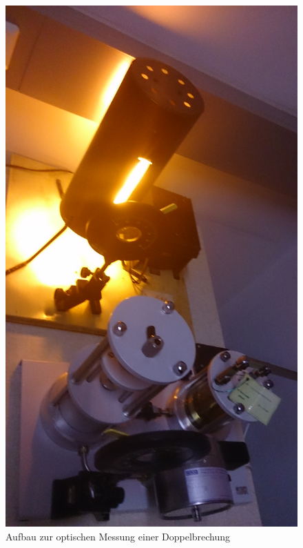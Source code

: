 \documentclass[12pt,a4paper]{article}
\begin{document}
\begin{multicols}{2}
\begin{figure}[H]
	\centering
	\includegraphics[scale=0.09,angle=-90]{./data/PS5_2_Aufbau.jpg}
	\caption{Aufbau zur optischen Messung einer Doppelbrechung}
	\label{fig:spannung_aufbau}
\end{figure}


\end{multicols}
\end{document}
